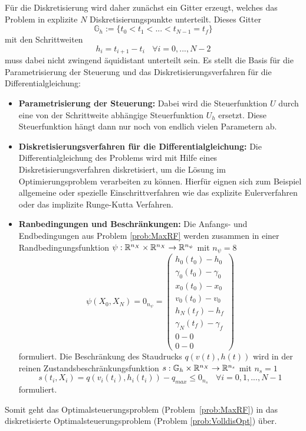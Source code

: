 Für die Diskretisierung wird daher zunächst ein Gitter erzeugt, welches das Problem in explizite $N$ Diskretisierungspunkte unterteilt. Dieses Gitter 
\[\mathbb{G}_h := \lbrace t_0 < t_1 < ... < t_{N-1} = t_f \rbrace\]
mit den Schrittweiten 
\[h_i = t_{i+1} - t_i \ \ \ \ \forall i = 0,...,N-2\]
muss dabei nicht zwingend äquidistant unterteilt sein. Es stellt die Basis für die Parametrisierung der Steuerung und das Diskretisierungsverfahren für die Differentialgleichung:
\begin{itemize}
\item \textbf{Parametrisierung der Steuerung:} Dabei wird die Steuerfunktion $U$ durch eine von der Schrittweite abhängige Steuerfunktion $U_h$ ersetzt. Diese Steuerfunktion hängt dann nur noch von endlich vielen Parametern ab.
%
\item \textbf{Diskretisierungsverfahren für die Differentialgleichung:} Die Differentialgleichung des Problems wird mit Hilfe eines Diskretisierungsverfahren diskretisiert, um die Lösung im Optimierungsproblem verarbeiten zu können. Hierfür eignen sich zum Beispiel allgemeine oder spezielle Einschrittverfahren wie das explizite Eulerverfahren oder das implizite Runge-Kutta Verfahren.
%
\item \textbf{Ranbedingungen und Beschränkungen:} Die Anfangs- und Endbedingungen aus Problem \ref{prob:MaxRF} werden zusammen in einer Randbedingungsfunktion $\psi : \mathbb{R}^{n_X} \times \mathbb{R}^{n_X} \to \mathbb{R}^{n_{\psi}}$ mit $n_{\psi} = 8$
\[\psi(X_0,X_N) = 0_{n_{\psi}} = \begin{pmatrix}
h_0(t_0) - h_0 \\ 
\gamma_0(t_0) - \gamma_0 \\
x_0(t_0) - x_0 \\ 
v_0(t_0) - v_0 \\ 
h_N(t_f) - h_f \\ 
\gamma_N(t_f) - \gamma_f \\
0 - 0 \\ 
0 - 0
\end{pmatrix}\] formuliert. Die Beschränkung des Staudrucks $q(v(t),h(t))$ wird in der reinen Zustandsbeschränkungsfunktion $s : \mathbb{G}_h \times \mathbb{R}^{n_X} \to \mathbb{R}^{n_s}$ mit $n_s = 1$
\[s(t_i,X_i) = q(v_i(t_i),h_i(t_i)) - q_{max} \leq 0_{n_s} \ \ \ \ \forall i = 0,1,...,N-1\] formuliert.
\end{itemize}
Somit geht das Optimalsteuerungsproblem (Problem~\ref{prob:MaxRF}) in das diskretisierte Optimalsteuerungsproblem (Problem \ref{prob:VolldisOpt}) über.

